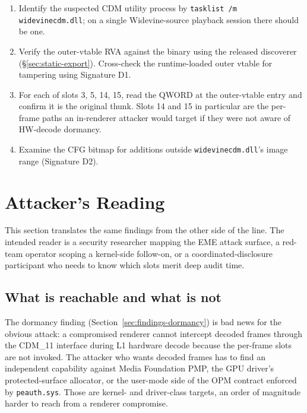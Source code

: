 \documentclass[11pt,letterpaper]{article}
\let\oldsection\section
\renewcommand{\section}{\clearpage\oldsection}
\begin{document}
\begin{enumerate}[itemsep=2pt]
  \item Identify the suspected CDM utility process by
        \texttt{tasklist /m widevinecdm.dll}; on a single
        Widevine-source playback session there should be one.
  \item Verify the outer-vtable RVA against the binary using the
        released discoverer
        (\S\ref{sec:static-export}). Cross-check the
        runtime-loaded outer vtable for tampering using
        Signature D1.
  \item For each of slots 3, 5, 14, 15, read the QWORD at the
        outer-vtable entry and confirm it is the original thunk.
        Slots 14 and 15 in particular are the per-frame paths an
        in-renderer attacker would target if they were not aware of
        HW-decode dormancy.
  \item Examine the CFG bitmap for additions outside
        \texttt{widevinecdm.dll}'s image range (Signature D2).
\end{enumerate}

\section{Attacker's Reading}
\label{sec:attacker}

This section translates the same findings from the other side of
the line. The intended reader is a security researcher mapping the
EME attack surface, a red-team operator scoping a kernel-side
follow-on, or a coordinated-disclosure participant who needs to
know which slots merit deep audit time.

\subsection{What is reachable and what is not}

The dormancy finding (Section~\ref{sec:findings-dormancy}) is bad
news for the obvious attack: a compromised renderer cannot
intercept decoded frames through the CDM\_11 interface during L1
hardware decode because the per-frame slots are not invoked. The
attacker who wants decoded frames has to find an independent
capability against Media Foundation PMP, the GPU driver's
protected-surface allocator, or the user-mode side of the OPM
contract enforced by \texttt{peauth.sys}. Those are kernel- and
driver-class targets, an order of magnitude harder to reach from a
renderer compromise.
\end{document}
